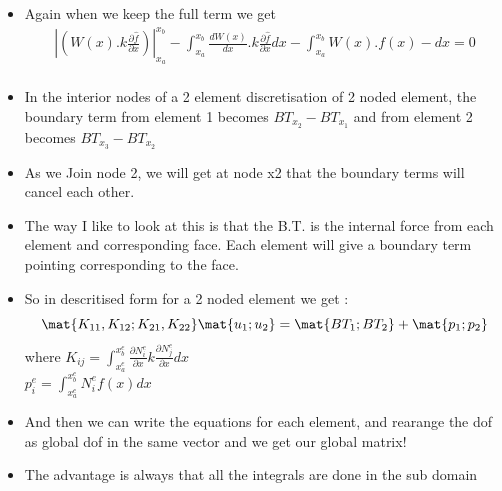 	\begin{frame}
		\begin{itemize}
		\item Again when we keep the full term we get
		\begin{equation}
			\begin{aligned}
		     	\left|\left(W(x).k \frac{\partial \hat{f}}{\partial x} \right) \right|^{x_b}_{x_a}- \int_{x_a}^{x_b} \frac{dW(x)}{dx}.k \frac{\partial \hat{f}}{\partial x} dx -  \int_{x_a}^{x_b} W(x).f(x) - dx = 0 \\
			\end{aligned}
		\end{equation}			
		\item In the interior nodes of a 2 element discretisation of 2 noded element, the boundary term from element 1 becomes $BT_{x_2}-BT_{x_1}$ and from element 2 becomes $BT_{x_3}-BT_{x_ 2}$
		\item As we Join node 2, we will get at node x2 that the boundary terms will cancel each other.
		\item The way I like to look at this is that the B.T. is the internal force from each element and corresponding face. Each element will give a boundary term pointing corresponding to the face.
		\end{itemize}
	\end{frame}



	\begin{frame}
		\begin{itemize}
			\item 	So in descritised form for a 2 noded element we get :
			\begin{equation}
			\mat{K_{11},K_{12}; K_{21},K_{22} }\mat{u_1;u_2} = \mat{BT_1;BT_2} +\mat{p_1;p_2} 
			\end{equation}	
			where $K_{ij} =  \int_{x_a^e}^{x_b^e}\frac{\partial N^e_i}{\partial x} k\frac{\partial N^e_j}{\partial x} dx$ \\ 
			$p_i^e = \int_{x_a^e}^{x_b^e}N_i^e f(x)dx$
			\item And then we can write the equations for each element, and rearange the dof as global dof in the same vector and we get our global matrix!	
			\item The advantage is always that all the integrals are done in the sub domain
	\end{itemize}
	\end{frame}



